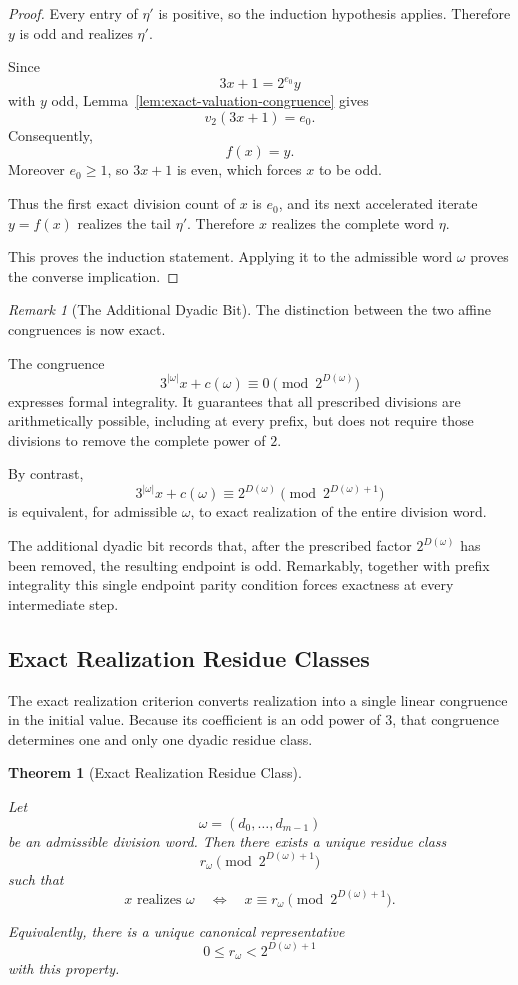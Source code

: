 \documentclass[12pt, oneside]{article}
\numberwithin{equation}{section}
\theoremstyle{definition}
\theoremstyle{plain}
\newtheorem{theorem}{Theorem}[section]
\theoremstyle{remark}
\newtheorem*{remark}{Remark}
\begin{document}
\begin{proof}
Every entry of \(\eta'\) is positive, so the induction hypothesis applies.
Therefore \(y\) is odd and realizes \(\eta'\).

Since
\[
3x+1=2^{e_0}y
\]
with \(y\) odd, Lemma~\ref{lem:exact-valuation-congruence} gives
\[
v_2(3x+1)=e_0.
\]
Consequently,
\[
f(x)=y.
\]
Moreover \(e_0\ge1\), so \(3x+1\) is even, which forces \(x\) to be odd.

Thus the first exact division count of \(x\) is \(e_0\), and its next
accelerated iterate \(y=f(x)\) realizes the tail \(\eta'\). Therefore
\(x\) realizes the complete word \(\eta\).

This proves the induction statement. Applying it to the admissible word
\(\omega\) proves the converse implication.
\end{proof}

\begin{remark}[The Additional Dyadic Bit]
The distinction between the two affine congruences is now exact.

The congruence
\[
3^{|\omega|}x+c(\omega)
\equiv
0
\pmod{2^{D(\omega)}}
\]
expresses formal integrality. It guarantees that all prescribed divisions
are arithmetically possible, including at every prefix, but does not require
those divisions to remove the complete power of \(2\).

By contrast,
\[
3^{|\omega|}x+c(\omega)
\equiv
2^{D(\omega)}
\pmod{2^{D(\omega)+1}}
\]
is equivalent, for admissible \(\omega\), to exact realization of the
entire division word.

The additional dyadic bit records that, after the prescribed factor
\(2^{D(\omega)}\) has been removed, the resulting endpoint is odd.
Remarkably, together with prefix integrality this single endpoint parity
condition forces exactness at every intermediate step.
\end{remark}


\subsection{Exact Realization Residue Classes}

The exact realization criterion converts realization into a single linear
congruence in the initial value. Because its coefficient is an odd power of
\(3\), that congruence determines one and only one dyadic residue class.

\begin{theorem}[Exact Realization Residue Class]
\label{thm:exact-realization-residue-class}

Let
\[
\omega=(d_0,\dots,d_{m-1})
\]
be an admissible division word. Then there exists a unique residue class
\[
r_\omega
\pmod{2^{D(\omega)+1}}
\]
such that
\[
x\text{ realizes }\omega
\quad\Longleftrightarrow\quad
x\equiv r_\omega
\pmod{2^{D(\omega)+1}}.
\]

Equivalently, there is a unique canonical representative
\[
0\le r_\omega<2^{D(\omega)+1}
\]
with this property.
\end{theorem}
\end{document}

